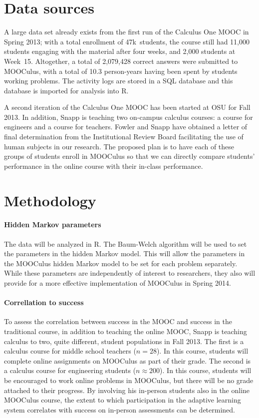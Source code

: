 \documentclass[12pt]{article}
\begin{document}
\section{Data sources}

A large data set already exists from the first run of the Calculus One
MOOC in Spring 2013; with a total enrollment of 47k~students, the
course still had 11,000 students engaging with the material after four
weeks, and 2,000 students at Week~15.  Altogether, a total of
2,079,428 correct answers were submitted to MOOCulus, with a total of
10.3 person-years having been spent by students working problems.  The
activity logs are stored in a SQL database and this database is
imported for analysis into R.

A second iteration of the Calculus One MOOC has been started at OSU
for Fall 2013.  In addition, Snapp is teaching two on-campus calculus
courses: a course for engineers and a course for teachers.  Fowler and
Snapp have obtained a letter of final determination from the
Institutional Review Board facilitating the use of human subjects in
our research.  The proposed plan is to have each of these groups of
students enroll in MOOCulus so that we can directly compare students'
performance in the online course with their in-class performance.


\section{Methodology}

\paragraph{Hidden Markov parameters}

The data will be analyzed in R. The Baum-Welch algorithm will be used
to set the parameters in the hidden Markov model. This will allow the
parameters in the MOOCulus hidden Markov model to be set for each
problem separately. While these parameters are independently of
interest to researchers, they also will provide for a more effective
implementation of MOOCulus in Spring 2014.

\paragraph{Correllation to success}

To assess the correlation between success in the MOOC and success in
the traditional course, in addition to teaching the online MOOC, Snapp
is teaching calculus to two, quite different, student populations in
Fall 2013.  The first is a calculus course for middle school teachers
($n=28$). In this course, students will complete online assignments on
MOOCulus as part of their grade.  The second is a calculus course for
engineering students ($n\approx 200$).  In this course, students will
be encouraged to work online problems in MOOCulus, but there will be
no grade attached to their progress.  By involving his in-person
students also in the online MOOCulus course, the extent to which
participation in the adaptive learning system correlates with success
on in-person assessments can be determined.
\end{document}
